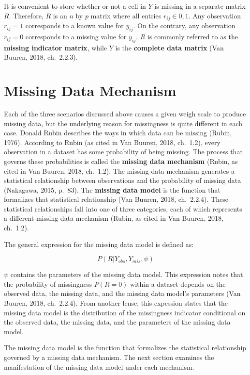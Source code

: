 \documentclass[12pt,oneside]{chicagocapstone}
\begin{document}
It is convenient to store whether or not a cell in \(Y\) is missing in a
separate matrix \(R\). Therefore, \(R\) is an \(n\) by \(p\) matrix
where all entries \(r_{ij} \in {0, 1}\). Any observation \(r_{ij}=1\)
corresponds to a known value for \(y_{ij}\). On the contrary, any
observation \(r_{ij}=0\) corresponds to a missing value for \(y_{ij}\).
\(R\) is commonly referred to as the \textbf{missing indicator matrix},
while \(Y\) is the \textbf{complete data matrix} (Van Buuren, 2018,
ch.~2.2.3).

\section*{Missing Data Mechanism}\label{background-missing-data-mech}

Each of the three scenarios discussed above causes a given weigh scale
to produce missing data, but the underlying reason for missingness is
quite different in each case. Donald Rubin describes the ways in which
data can be missing (Rubin, 1976). According to Rubin (as cited in Van
Buuren, 2018, ch.~1.2), every observation in a dataset has some
probability of being missing. The process that governs these
probabilities is called the \textbf{missing data mechanism} (Rubin, as
cited in Van Buuren, 2018, ch.~1.2). The missing data mechanism
generates a statistical relationship between observations and the
probability of missing data (Nakagawa, 2015, p.~83). The \textbf{missing
data model} is the function that formalizes that statistical
relationship (Van Buuren, 2018, ch.~2.2.4). These statistical
relationships fall into one of three categories, each of which
represents a different missing data mechanism (Rubin, as cited in Van
Buuren, 2018, ch.~1.2).

The general expression for the missing data model is defined as:

\[P(R|Y_{obs}, Y_{mis},\psi)\]

\(\psi\) contains the parameters of the missing data model. This
expression notes that the probability of missingness \(P(R=0)\) within a
dataset depends on the observed data, the missing data, and the missing
data model's parameters (Van Buuren, 2018, ch.~2.2.4). From another
lense, this expession states that the missing data model is the
distribution of the missingness indicator conditional on the observed
data, the missing data, and the parameters of the missing data model.

The missing data model is the function that formalizes the statistical
relationship governed by a missing data mechanism. The next section
examines the manifestation of the missing data model under each
mechanism.
\end{document}
